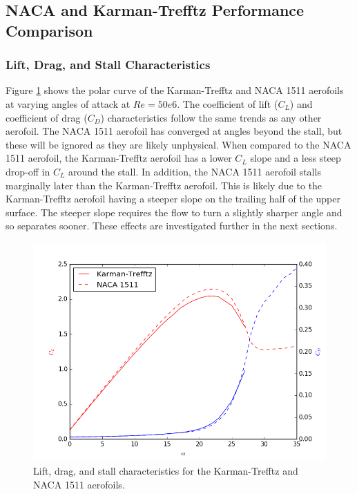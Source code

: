 \documentclass[10pt,a4paper]{article}
\begin{document}
\subsection{NACA and Karman-Trefftz Performance Comparison}
\subsubsection{Lift, Drag, and Stall Characteristics}
Figure \ref{fig:characteristics} shows the polar curve of the Karman-Trefftz and NACA 1511 aerofoils at varying angles of attack at $Re = 50e6$. The coefficient of lift ($C_L$) and coefficient of drag ($C_D$) characteristics follow the same trends as any other aerofoil. The NACA 1511 aerofoil has converged at angles beyond the stall, but these will be ignored as they are likely unphysical. When compared to the NACA 1511 aerofoil, the Karman-Trefftz aerofoil has a lower $C_L$ slope and a less steep drop-off in $C_L$ around the stall. In addition, the NACA 1511 aerofoil stalls marginally later than the Karman-Trefftz aerofoil. This is likely due to the Karman-Trefftz aerofoil having a steeper slope on the trailing half of the upper surface. The steeper slope requires the flow to turn a slightly sharper angle and so separates sooner. These effects are investigated further in the next sections.
\begin{figure}[!htb]
\centering
\includegraphics[scale=0.6]{Figures/polar_characteristics.png}
\caption{Lift, drag, and stall characteristics for the Karman-Trefftz and NACA 1511 aerofoils.}
\label{fig:characteristics}
\end{figure}
\end{document}
